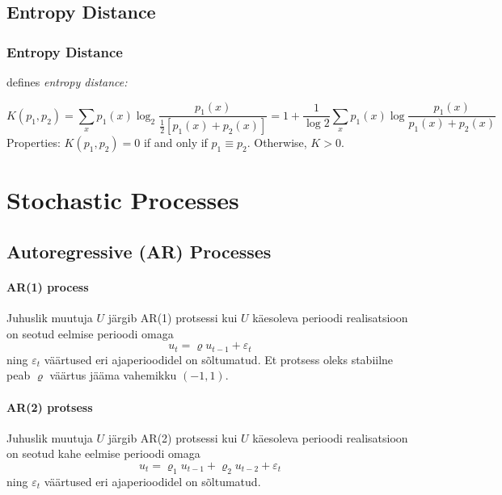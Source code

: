 \documentclass[a4paper]{article}
\numberwithin{equation}{subsection}
\begin{document}
\subsection{Entropy Distance}
\label{sec:entropy_distance}

\subsubsection{Entropy Distance}
\label{sec:lin1991_entropy_distance}

\citet{lin1991} defines \emph{entropy distance:}

\begin{equation}
  K(p_{1},p_{2})
  =
  \sum_{x} p_{1}(x)
  \log_{2}
  \frac{p_{1}(x)}
  {\frac{1}{2}[p_{1}(x) + p_{2}(x)]}
  =
  1 + \frac{1}{\log 2}
  \sum_{x} p_{1}(x)
  \log
  \frac{p_{1}(x)}
  {p_{1}(x) + p_{2}(x)}
\end{equation}
Properties: $K(p_{1}, p_{2}) = 0$ if and only if $p_{1} \equiv
p_{2}$.  Otherwise, $K > 0$.

\newpage
\section{Stochastic Processes}

\subsection{Autoregressive (AR) Processes}

\paragraph{AR(1) process}

Juhuslik muutuja $U$ järgib AR(1) protsessi kui $U$ käesoleva perioodi
realisatsioon on seotud eelmise perioodi omaga
\begin{equation}
  u_t = \varrho u_{t-1} + \varepsilon_t
\end{equation}
ning $\varepsilon_t$ väärtused eri ajaperioodidel on sõltumatud.  Et
protsess oleks stabiilne peab $\varrho$ väärtus jääma vahemikku
$(-1, 1)$. 



\paragraph{AR(2) protsess}

Juhuslik muutuja $U$ järgib AR(2) protsessi kui $U$ käesoleva perioodi
realisatsioon on seotud kahe eelmise perioodi omaga
\begin{equation}
  u_t = \varrho_1 u_{t-1} + \varrho_2 u_{t-2} + \varepsilon_t
\end{equation}
ning $\varepsilon_t$ väärtused eri ajaperioodidel on sõltumatud.
\end{document}
